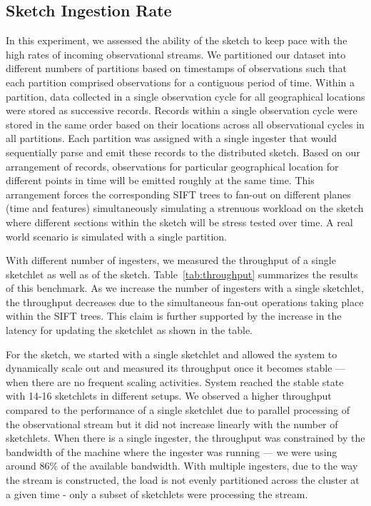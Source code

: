 \subsection{Sketch Ingestion Rate}
In this experiment, we assessed the ability of the sketch to keep pace with the high rates of incoming observational streams.
We partitioned our dataset into different numbers of partitions based on timestamps of observations such that each partition comprised observations for a contiguous period of time.
Within a partition, data collected in a single observation cycle for all geographical locations were stored as successive records.
Records within a single observation cycle were stored in the same order based on their locations across all observational cycles in all partitions.
Each partition was assigned with a single ingester that would sequentially parse and emit these records to the distributed sketch.
Based on our arrangement of records, observations for particular geographical location for different points in time will be emitted roughly at the same time.
This arrangement forces the corresponding SIFT trees to fan-out on different planes (time and features) simultaneously simulating a strenuous workload on the sketch where different sections within the sketch will be stress tested over time.
A real world scenario is simulated with a single partition.

With different number of ingesters, we measured the throughput of a single sketchlet as well as of the sketch.
Table~\ref{tab:throughput} summarizes the results of this benchmark.
As we increase the number of ingesters with a single sketchlet, the throughput decreases due to the simultaneous fan-out operations taking place within the SIFT trees. This claim is further supported by the increase in the latency for updating the sketchlet as shown in the table.

For the sketch, we started with a single sketchlet and allowed the system to dynamically scale out and measured its throughput once it becomes stable --- when there are no frequent scaling activities.
System reached the stable state with 14-16 sketchlets in different setups.
We observed a higher throughput compared to the performance of a single sketchlet due to parallel processing of the observational stream but it did not increase linearly with the number of sketchlets.
When there is a single ingester, the throughput was constrained by the bandwidth of the machine where the ingester was running --- we were using around 86\% of the available bandwidth.
With multiple ingesters, due to the way the stream is constructed, the load is not evenly partitioned across the cluster at a given time - only a subset of sketchlets were processing the stream.

